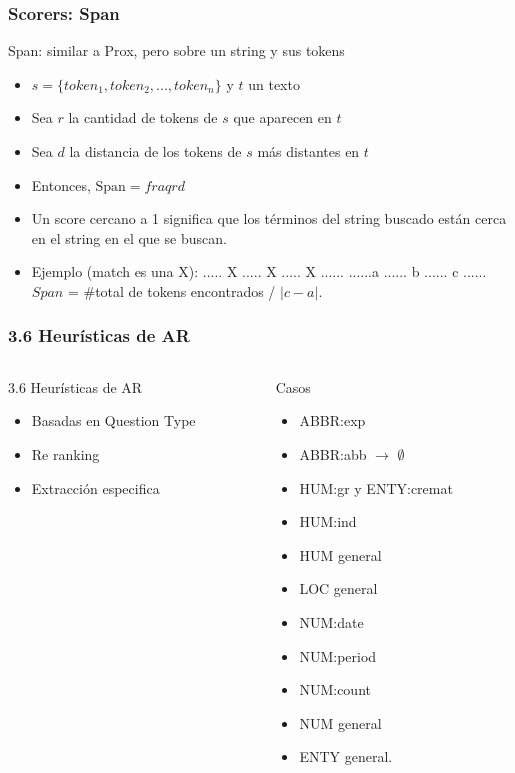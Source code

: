 \begin{frame}
\frametitle{Scorers: Span}
  \begin{block}{Span: similar a Prox, pero sobre un string y sus tokens}
  \begin{itemize}
  \item $s = \{token_1, token_2, ..., token_n\}$ y $t$ un texto
  \item Sea $r$ la cantidad de tokens de $s$ que aparecen en $t$
  \item Sea $d$ la distancia de los tokens de $s$ más distantes en $t$
  \item Entonces, $\text{Span}=fraq{r}{d}$
  \item Un score cercano a 1 significa que los términos del string buscado están cerca en el string en el que se buscan.
  \item Ejemplo (match es una X):
        ..... X ..... X ..... X ...... \newline
        ......a ...... b ...... c ...... \newline
    $Span$ = \#total de tokens encontrados / $| c - a |$.
  \end{itemize}
  \end{block}
\end{frame}


\begin{frame}
  \frametitle{3.6 Heurísticas de AR}
\begin{columns}[T] %
\begin{column}{.48\textwidth}
    \begin{block}{3.6 Heurísticas de AR}
  \begin{itemize}
      \item Basadas en Question Type
      \item Re ranking
      \item Extracción especifica
  \end{itemize}
  \end{block}

\end{column}%
\hfill%
\begin{column}{.48\textwidth}

Casos
  \begin{itemize}
  \item ABBR:exp
  \item ABBR:abb $\rightarrow$ $\emptyset$
  \item HUM:gr y ENTY:cremat
  \item HUM:ind
  \item HUM general
  \item LOC general
  \item NUM:date
  \item NUM:period
  \item NUM:count
  \item NUM general
  \item ENTY general.
\end{itemize}

\end{column}%
\end{columns}
\end{frame}


